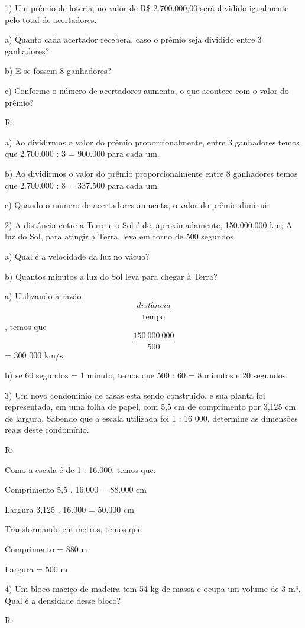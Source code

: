 
1) Um prêmio de loteria, no valor de R\$ 2.700.000,00 será dividido
igualmente pelo total de acertadores.

a) Quanto cada acertador receberá, caso o prêmio seja dividido entre 3
ganhadores?

b) E se fossem 8 ganhadores?

c) Conforme o número de acertadores aumenta, o que acontece com o valor
do prêmio?

R:

a) Ao dividirmos o valor do prêmio proporcionalmente, entre 3 ganhadores
temos que 2.700.000 : 3 = 900.000 para cada um.

b) Ao dividirmos o valor do prêmio proporcionalmente entre 8 ganhadores
temos que 2.700.000 : 8 = 337.500 para cada um.

c) Quando o número de acertadores aumenta, o valor do prêmio diminui.

2) A distância entre a Terra e o Sol é de, aproximadamente, 150.000.000
km; A luz do Sol, para atingir a Terra, leva em torno de 500 segundos.

a) Qual é a velocidade da luz no vácuo?

b) Quantos minutos a luz do Sol leva para chegar à Terra?

a) Utilizando a razão \[\frac{distância}{\text{tempo}}\], temos que
\[\frac{150\ 000\ 000}{500}\] = 300 000 km/s

b) se 60 segundos = 1 minuto, temos que 500 : 60 = 8 minutos e 20
segundos.

3) Um novo condomínio de casas está sendo construído, e sua planta foi
representada, em uma folha de papel, com 5,5 cm de comprimento por 3,125
cm de largura. Sabendo que a escala utilizada foi 1 : 16 000, determine
as dimensões reais deste condomínio.

R:

Como a escala é de 1 : 16.000, temos que:

Comprimento 5,5 . 16.000 = 88.000 cm

Largura 3,125 . 16.000 = 50.000 cm

Transformando em metros, temos que

Comprimento = 880 m

Largura = 500 m

4) Um bloco maciço de madeira tem 54 kg de massa e ocupa um volume de 3
m³. Qual é a densidade desse bloco?

R:

